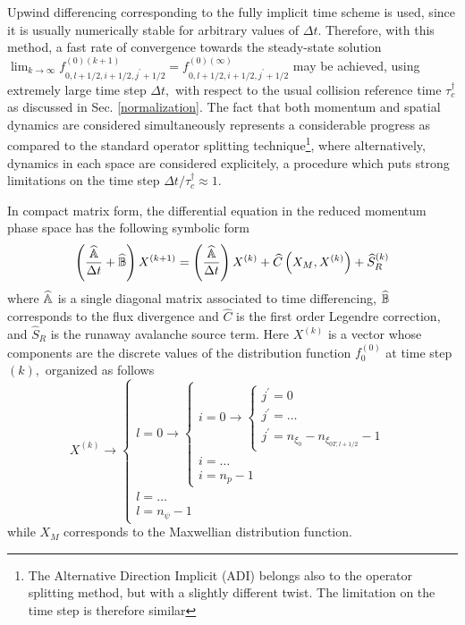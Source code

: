 Upwind differencing corresponding to the fully implicit time scheme is used,
since it is usually numerically stable for arbitrary values of $\Delta t.$
Therefore, with this method, a fast rate of convergence towards the
steady-state solution $\lim_{k\rightarrow \infty }f_{0,l+1/2,i+1/2,j^{\prime
}+1/2}^{\left( 0\right) (k+1)}=f_{0,l+1/2,i+1/2,j^{\prime }+1/2}^{\left(
0\right) (\infty )}$ may be achieved, using extremely large time step $%
\Delta t,$ with respect to the usual collision reference time $\tau
_{c}^{\dagger }$ as discussed in Sec. \ref{normalization}. The fact that
both momentum and spatial dynamics are considered simultaneously represents
a considerable progress as compared to the standard operator splitting
technique\footnote{%
The Alternative Direction Implicit (ADI) belongs also to the operator
splitting method, but with a slightly different twist. The limitation on the
time step is therefore similar}, where alternatively, dynamics in each space
are considered explicitely, a procedure which puts strong limitations on the
time step $\Delta t/\tau _{c}^{\dagger }\approx 1.$

In compact matrix form, the differential equation in the reduced momentum
phase space has the following symbolic form
\begin{equation}
\left( \frac{\widehat{\Bbb{A}}}{\Delta t}+\widehat{\Bbb{B}}\right)
X^{(k+1)}=\left( \frac{\widehat{\Bbb{A}}}{\Delta t}\right) X^{(k)}+\widehat{C%
}\left( X_{M},X^{(k)}\right) +\widehat{S}_{R}^{(k)}  \label{Matrixeq}
\end{equation}
where $\widehat{\Bbb{A}}$ is a single diagonal matrix associated to time
differencing, $\widehat{\Bbb{B}}$ corresponds to the flux divergence and $%
\widehat{C}$ is the first order Legendre correction, and $\widehat{S}_{R}$
is the runaway avalanche source term. Here $X^{(k)}$ is a vector whose
components are the discrete values of the distribution function $%
f_{0}^{\left( 0\right) }$ at time step $\left( k\right) ,$ organized as
follows
\begin{equation}
X^{(k)}\rightarrow \left\{
\begin{array}{l}
l=0\rightarrow \left\{
\begin{array}{l}
i=0\rightarrow \left\{
\begin{array}{l}
j^{\prime }=0 \\
j^{\prime }=\ldots \\
j^{\prime }=n_{\xi _{0}}-n_{\xi _{0T,l+1/2}}-1
\end{array}
\right. \\
i=\ldots \\
i=n_{p}-1
\end{array}
\right. \\
l=\ldots \\
l=n_{\psi }-1
\end{array}
\right.
\end{equation}
while $X_{M}$ corresponds to the Maxwellian distribution function.

